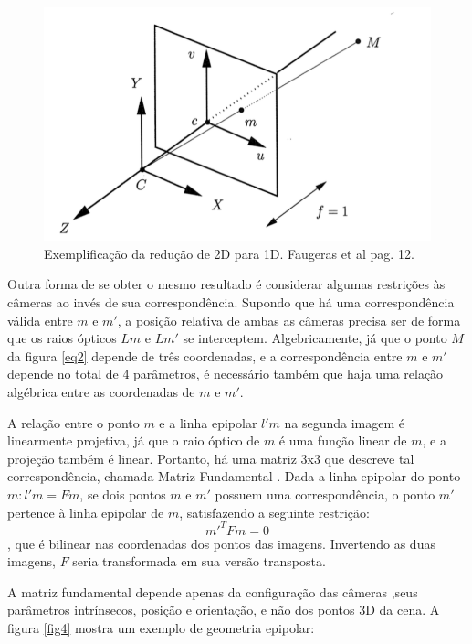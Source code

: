 \begin{figure}
	\centering
		\includegraphics{Imagens/figura2-3.png}
	\caption{Exemplificação da redução de 2D para 1D. Faugeras et al \cite{Faugeras-Geometry} pag. 12.}
	\label{fig3}
\end{figure}

Outra forma de se obter o mesmo resultado é considerar algumas restrições às câmeras ao invés de sua correspondência. Supondo que há uma correspondência válida entre $m$ e $m'$, a posição relativa de ambas as câmeras precisa ser de forma que os raios ópticos $Lm$ e $Lm'$ se interceptem. Algebricamente, já que o ponto $M$ da figura \ref{eq2} depende de três coordenadas, e a correspondência entre $m$ e $m'$ depende no total de 4 parâmetros, é necessário também que haja uma relação algébrica entre as coordenadas de $m$ e $m'$.

A relação entre o ponto $m$ e a linha epipolar $l'm$ na segunda imagem é linearmente projetiva, já que o raio óptico de $m$ é uma função linear de $m$, e a projeção também é linear. Portanto, há uma matriz 3x3 que descreve tal correspondência, chamada Matriz Fundamental \cite{Faugeras-Geometry}. Dada a linha epipolar do ponto $m: l'm = Fm$, se dois pontos $m$ e $m'$ possuem uma correspondência, o ponto $m'$ pertence à linha epipolar de $m$, satisfazendo a seguinte restrição: 
\begin{equation}\label{eq4}m'^TFm = 0\end{equation}, que é bilinear nas coordenadas dos pontos das imagens. Invertendo as duas imagens, $F$ seria transformada em sua versão transposta.

A matriz fundamental depende apenas da configuração das câmeras ,seus parâmetros intrínsecos, posição e orientação, e não dos pontos 3D da cena. A figura \ref{fig4} mostra um exemplo de geometria epipolar:

